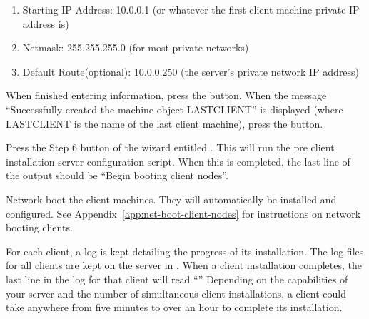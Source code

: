 \begin{enumerate}
\item Starting IP Address: 10.0.0.1 (or whatever the first client
  machine private IP address is)
\item Netmask: 255.255.255.0 (for most private networks)
\item Default Route(optional): 10.0.0.250 (the server's private network 
  IP address)
\end{enumerate}
  
When finished entering information, press the  button.
When the message ``Successfully created the machine object LASTCLIENT''
is displayed (where LASTCLIENT is the name of the last client machine),
press the  button.


Press the Step 6 button of the wizard entitled 
. This will
run the pre client installation server configuration script.
When this is completed, the last line of the output should
be ``Begin booting client nodes''.


Network boot the client machines. They will automatically be
installed and configured. 
See Appendix~\ref{app:net-boot-client-nodes} for instructions on
network booting clients.


For each client, a log is kept detailing the progress of its
installation. The log files for all clients are kept on the server in
. When a client installation completes, the
last line in the log for that client will read ``'' Depending on the capabilities of
your server and the number of simultaneous client installations, a
client could take anywhere from five minutes to over an hour to
complete its installation.
  

